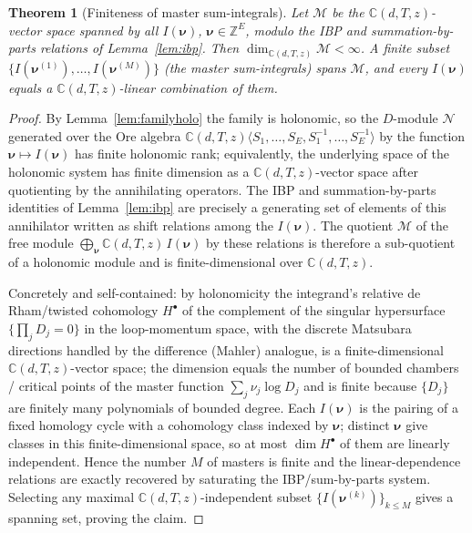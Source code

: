 \documentclass{amsart}
\newtheorem{theorem}{Theorem}
\theoremstyle{definition}
\begin{document}
\begin{theorem}[Finiteness of master sum-integrals]\label{thm:finite}
Let $\mathcal M$ be the $\mathbb C(d,T,z)$-vector space spanned by all
$I(\boldsymbol\nu)$, $\boldsymbol\nu\in\mathbb Z^E$, modulo the IBP and
summation-by-parts relations of Lemma~\ref{lem:ibp}. Then
$\dim_{\mathbb C(d,T,z)}\mathcal M<\infty$. A finite subset
$\{I(\boldsymbol\nu^{(1)}),\dots,I(\boldsymbol\nu^{(M)})\}$ (the \emph{master
sum-integrals}) spans $\mathcal M$, and every $I(\boldsymbol\nu)$ equals a
$\mathbb C(d,T,z)$-linear combination of them.
\end{theorem}

\begin{proof}
By Lemma~\ref{lem:familyholo} the family is holonomic, so the
$D$-module $\mathcal N$ generated over the Ore algebra
$\mathbb C(d,T,z)\langle S_1,\dots,S_E, S_1^{-1},\dots,S_E^{-1}\rangle$
by the function $\boldsymbol\nu\mapsto I(\boldsymbol\nu)$ has finite holonomic
rank; equivalently, the underlying space of the holonomic system has finite
dimension as a $\mathbb C(d,T,z)$-vector space after quotienting by the
annihilating operators. The IBP and summation-by-parts identities of
Lemma~\ref{lem:ibp} are precisely a generating set of elements of this
annihilator written as shift relations among the $I(\boldsymbol\nu)$. The
quotient $\mathcal M$ of the free module $\bigoplus_{\boldsymbol\nu}
\mathbb C(d,T,z)\,I(\boldsymbol\nu)$ by these relations is therefore a
sub-quotient of a holonomic module and is finite-dimensional over
$\mathbb C(d,T,z)$.

Concretely and self-contained: by holonomicity the integrand's relative de
Rham/twisted cohomology $H^{\bullet}$ of the complement of the singular
hypersurface $\{\prod_j D_j=0\}$ in the loop-momentum space, with the discrete
Matsubara directions handled by the difference (Mahler) analogue, is a
finite-dimensional $\mathbb C(d,T,z)$-vector space; the dimension equals the
number of bounded chambers / critical points of the master function
$\sum_j \nu_j\log D_j$ and is finite because $\{D_j\}$ are finitely many
polynomials of bounded degree. Each $I(\boldsymbol\nu)$ is the pairing of a
fixed homology cycle with a cohomology class indexed by $\boldsymbol\nu$;
distinct $\boldsymbol\nu$ give classes in this finite-dimensional space, so at
most $\dim H^\bullet$ of them are linearly independent. Hence the number $M$ of
masters is finite and the linear-dependence relations are exactly recovered by
saturating the IBP/sum-by-parts system. Selecting any maximal
$\mathbb C(d,T,z)$-independent subset $\{I(\boldsymbol\nu^{(k)})\}_{k\le M}$
gives a spanning set, proving the claim.
\end{proof}
\end{document}
